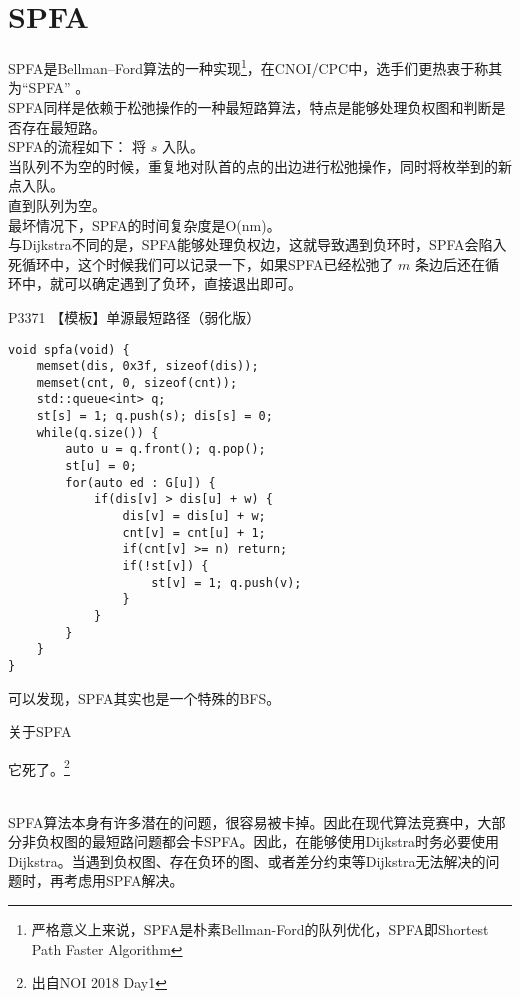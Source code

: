 \documentclass{beamer}
\begin{document}
\section{SPFA}
\begin{frame}
SPFA是Bellman–Ford算法的一种实现\footnote{严格意义上来说，SPFA是朴素Bellman-Ford的队列优化，SPFA即Shortest Path Faster Algorithm}，在CNOI/CPC中，选手们更热衷于称其为“SPFA” 。\\
SPFA同样是依赖于松弛操作的一种最短路算法，特点是能够处理负权图和判断是否存在最短路。\\ 
SPFA的流程如下：
将 $s$ 入队。 \\ 
当队列不为空的时候，重复地对队首的点的出边进行松弛操作，同时将枚举到的新点入队。 \\ 
直到队列为空。 \\
最坏情况下，SPFA的时间复杂度是O(nm)。\\ 
与Dijkstra不同的是，SPFA能够处理负权边，这就导致遇到负环时，SPFA会陷入死循环中，这个时候我们可以记录一下，如果SPFA已经松弛了 $m$ 条边后还在循环中，就可以确定遇到了负环，直接退出即可。
\end{frame}
\begin{frame}[fragile]
P3371 【模板】单源最短路径（弱化版）\\ 
\begin{onlyenv}
\begin{verbatim}
void spfa(void) {
    memset(dis, 0x3f, sizeof(dis));
    memset(cnt, 0, sizeof(cnt));
    std::queue<int> q;
    st[s] = 1; q.push(s); dis[s] = 0;
    while(q.size()) {
        auto u = q.front(); q.pop();
        st[u] = 0;
        for(auto ed : G[u]) {
            if(dis[v] > dis[u] + w) {
                dis[v] = dis[u] + w;
                cnt[v] = cnt[u] + 1;
                if(cnt[v] >= n) return;
                if(!st[v]) {
                    st[v] = 1; q.push(v);
                }
            }
        }
    }
}
\end{verbatim}
\end{onlyenv}
可以发现，SPFA其实也是一个特殊的BFS。
\end{frame}
\begin{frame}
\begin{large}
关于SPFA\\
\end{large}
\begin{small}
它死了。\footnote{出自NOI 2018 Day1} \\ 
\end{small}
\\
SPFA算法本身有许多潜在的问题，很容易被卡掉。因此在现代算法竞赛中，大部分非负权图的最短路问题都会卡SPFA。因此，在能够使用Dijkstra时务必要使用Dijkstra。当遇到负权图、存在负环的图、或者差分约束等Dijkstra无法解决的问题时，再考虑用SPFA解决。
\end{frame}
\end{document}
